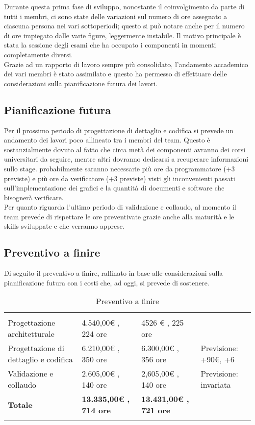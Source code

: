 Durante questa prima fase di sviluppo, nonostante il coinvolgimento da parte di tutti i membri, ci sono state delle variazioni sul numero di ore assegnato a ciascuna persona nei vari sottoperiodi; questo si può notare anche per il numero di ore impiegato dalle varie figure, leggermente instabile. Il motivo principale è stata la sessione degli esami che ha occupato i componenti in momenti completamente diversi.\\ Grazie ad un rapporto di lavoro sempre più consolidato, l'andamento accademico dei vari membri è stato assimilato e questo ha permesso di effettuare delle considerazioni sulla pianificazione futura dei lavori.

\subsection{Pianificazione futura}

Per il prossimo periodo di progettazione di dettaglio e codifica si prevede un andamento dei lavori poco allineato tra i membri del team. Questo è sostanzialmente dovuto al fatto che circa metà dei componenti avranno dei corsi universitari da seguire, mentre altri dovranno dedicarsi a recuperare informazioni sullo stage. probabilmente saranno necessarie più ore da programmatore (+3 previste) e più ore da verificatore (+3 previste) visti gli inconvenienti passati sull'implementazione dei grafici e la quantità di documenti e software che bisognerà verificare. \\ Per quanto riguarda l'ultimo periodo di validazione e collaudo, al momento il team prevede di rispettare le ore preventivate grazie anche alla maturità e le skills sviluppate e che verranno apprese.

\subsection{Preventivo a finire}
Di seguito il preventivo a finire, raffinato in base alle considerazioni sulla pianificazione futura con i costi che, ad oggi, si prevede di sostenere.
{
\setlength\arrayrulewidth{1pt}
\begin{longtable}{ C{3.5cm} | C{5cm} | C{5cm} | C{2cm}} 
 	 &
 	 &
 	 & 
 	 \\
 	
 	Progettazione architetturale & 4.540,00€ , 224 ore & 4526 € , 225 ore & \begin{LARGE}\redcheck \end{LARGE}\\
 	Progettazione di dettaglio e codifica & 6.210,00€ , 350 ore & 6.300,00€ , 356 ore & Previsione: +90€, +6\\
 	Validazione e collaudo & 2.605,00€ , 140 ore  & 2,605,00€ , 140 ore   & Previsione: invariata\\
 	\textbf{Totale} & \textbf{13.335,00€ , 714 ore} & \textbf{13.431,00€ , 721 ore} &  \\
 	
 	\caption{Preventivo a finire}
\end{longtable}
}

\newpage